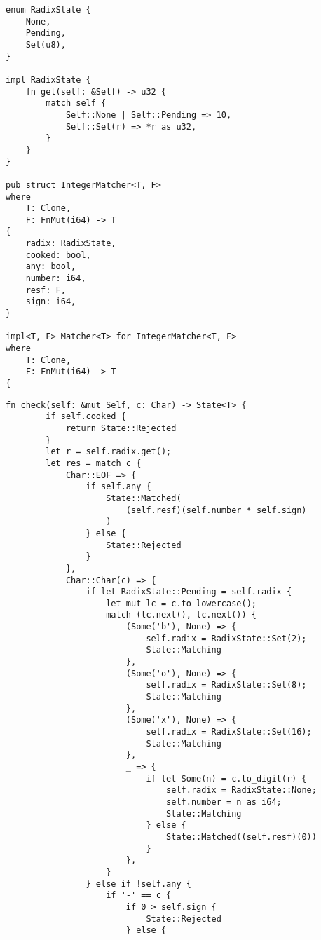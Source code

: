 \begin{lstlisting}[caption={Разбор целых чисел (часть 1)}, label={lst:rust_lexer_int1}]
enum RadixState {
    None,
    Pending,
    Set(u8),
}

impl RadixState {
    fn get(self: &Self) -> u32 {
        match self {
            Self::None | Self::Pending => 10,
            Self::Set(r) => *r as u32,
        }
    }
}

pub struct IntegerMatcher<T, F>
where
    T: Clone,
    F: FnMut(i64) -> T
{
    radix: RadixState,
    cooked: bool,
    any: bool,
    number: i64,
    resf: F,
    sign: i64,
}

impl<T, F> Matcher<T> for IntegerMatcher<T, F>
where
    T: Clone,
    F: FnMut(i64) -> T
{
\end{lstlisting}
\clearpage
\begin{lstlisting}[caption={Разбор целых чисел (часть 2)}, label={lst:rust_lexer_int2}]
    fn check(self: &mut Self, c: Char) -> State<T> {
        if self.cooked {
            return State::Rejected
        }
        let r = self.radix.get();
        let res = match c {
            Char::EOF => {
                if self.any {
                    State::Matched(
                        (self.resf)(self.number * self.sign)
                    )
                } else {
                    State::Rejected
                }
            },
            Char::Char(c) => {
                if let RadixState::Pending = self.radix {
                    let mut lc = c.to_lowercase();
                    match (lc.next(), lc.next()) {
                        (Some('b'), None) => {
                            self.radix = RadixState::Set(2);
                            State::Matching
                        },
                        (Some('o'), None) => {
                            self.radix = RadixState::Set(8);
                            State::Matching
                        },
                        (Some('x'), None) => {
                            self.radix = RadixState::Set(16);
                            State::Matching
                        },
                        _ => {
                            if let Some(n) = c.to_digit(r) {
                                self.radix = RadixState::None;
                                self.number = n as i64;
                                State::Matching
                            } else {
                                State::Matched((self.resf)(0))
                            }
                        },
                    }
                } else if !self.any {
                    if '-' == c {
                        if 0 > self.sign {
                            State::Rejected
                        } else {
\end{lstlisting}
